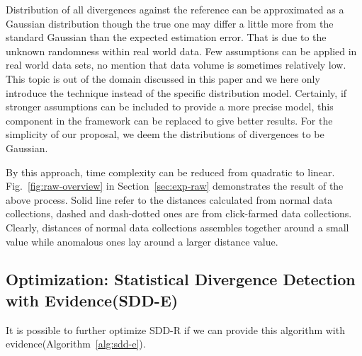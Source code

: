 \documentclass{article}
\begin{document}
			Distribution of all divergences against the reference can be approximated as a Gaussian distribution though the true one may differ a little more from the standard Gaussian than the expected estimation error. That is due to the unknown randomness within real world data. Few assumptions can be applied in real world data sets, no mention that data volume is sometimes relatively low. This topic is out of the domain discussed in this paper and we here only introduce the technique instead of the specific distribution model. 
			Certainly, if stronger assumptions can be included to provide a more precise model, this component in the framework can be replaced to give better results.
			For the simplicity of our proposal, we deem the distributions of divergences to be Gaussian.
			
			By this approach, time complexity can be reduced from quadratic to linear. Fig.~\ref{fig:raw-overview} in Section~\ref{sec:exp-raw} demonstrates the result of the above process. Solid line refer to the distances calculated from normal data collections, dashed and dash-dotted ones are from click-farmed data collections. Clearly, distances of normal data collections assembles together around a small value while anomalous ones lay around a larger distance value.
	
		\subsection{Optimization: Statistical Divergence Detection with Evidence(SDD-E)}
			It is possible to further optimize SDD-R if we can provide this algorithm with evidence(Algorithm~\ref{alg:sdd-e}).
	
\end{document}
